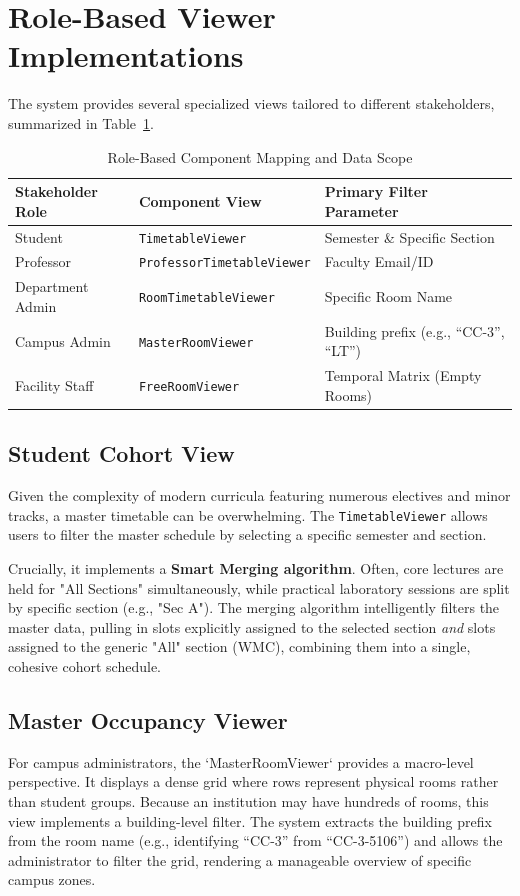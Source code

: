 \section{Role-Based Viewer Implementations}

The system provides several specialized views tailored to different stakeholders, summarized in Table~\ref{tab:view_mapping}.

\begin{table}[htbp]
\centering
\caption{Role-Based Component Mapping and Data Scope}
\label{tab:view_mapping}
\renewcommand{\arraystretch}{1.4}
\begin{tabularx}{\textwidth}{@{} l X l @{}}
\toprule
\textbf{Stakeholder Role} & \textbf{Component View} & \textbf{Primary Filter Parameter} \\
\midrule
Student & \texttt{TimetableViewer} & Semester \& Specific Section \\
Professor & \texttt{ProfessorTimetableViewer} & Faculty Email/ID \\
Department Admin & \texttt{RoomTimetableViewer} & Specific Room Name \\
Campus Admin & \texttt{MasterRoomViewer} & Building prefix (e.g., ``CC-3'', ``LT'') \\
Facility Staff & \texttt{FreeRoomViewer} & Temporal Matrix (Empty Rooms) \\
\bottomrule
\end{tabularx}
\end{table}

\subsection{Student Cohort View}
Given the complexity of modern curricula featuring numerous electives and minor tracks, a master timetable can be overwhelming. The \texttt{TimetableViewer} allows users to filter the master schedule by selecting a specific semester and section.

Crucially, it implements a \textbf{Smart Merging algorithm}. Often, core lectures are held for "All Sections" simultaneously, while practical laboratory sessions are split by specific section (e.g., "Sec A"). The merging algorithm intelligently filters the master data, pulling in slots explicitly assigned to the selected section \textit{and} slots assigned to the generic "All" section (WMC), combining them into a single, cohesive cohort schedule.

\subsection{Master Occupancy Viewer}
For campus administrators, the `MasterRoomViewer` provides a macro-level perspective. It displays a dense grid where rows represent physical rooms rather than student groups. Because an institution may have hundreds of rooms, this view implements a building-level filter. The system extracts the building prefix from the room name (e.g., identifying ``CC-3'' from ``CC-3-5106'') and allows the administrator to filter the grid, rendering a manageable overview of specific campus zones.

